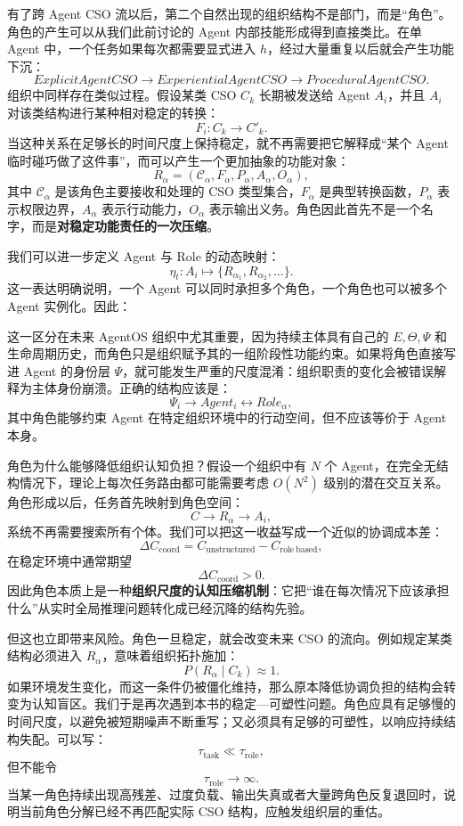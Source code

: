 有了跨 Agent CSO 流以后，第二个自然出现的组织结构不是部门，而是“角色”。角色的产生可以从我们此前讨论的 Agent 内部技能形成得到直接类比。在单 Agent 中，一个任务如果每次都需要显式进入 $h$，经过大量重复以后就会产生功能下沉：
\[
ExplicitAgentCSO
\rightarrow
ExperientialAgentCSO
\rightarrow
ProceduralAgentCSO.
\]
组织中同样存在类似过程。假设某类 CSO $C_k$ 长期被发送给 Agent $A_i$，并且 $A_i$ 对该类结构进行某种相对稳定的转换：
\[
F_i:C_k\rightarrow C'_k.
\]
当这种关系在足够长的时间尺度上保持稳定，就不再需要把它解释成“某个 Agent 临时碰巧做了这件事”，而可以产生一个更加抽象的功能对象：
\[
R_\alpha
=
\left(
\mathcal C_\alpha,
F_\alpha,
P_\alpha,
A_\alpha,
O_\alpha
\right),
\]
其中 $\mathcal C_\alpha$ 是该角色主要接收和处理的 CSO 类型集合，$F_\alpha$ 是典型转换函数，$P_\alpha$ 表示权限边界，$A_\alpha$ 表示行动能力，$O_\alpha$ 表示输出义务。角色因此首先不是一个名字，而是\textbf{对稳定功能责任的一次压缩}。

我们可以进一步定义 Agent 与 Role 的动态映射：
\[
\eta_t:A_i\mapsto\{R_{\alpha_1},R_{\alpha_2},\ldots\}.
\]
这一表达明确说明，一个 Agent 可以同时承担多个角色，一个角色也可以被多个 Agent 实例化。因此：
\begin{statementbox}
\centering
{}
\end{statementbox}
这一区分在未来 AgentOS 组织中尤其重要，因为持续主体具有自己的 $E,\Theta,\Psi$ 和生命周期历史，而角色只是组织赋予其的一组阶段性功能约束。如果将角色直接写进 Agent 的身份层 $\Psi$，就可能发生严重的尺度混淆：组织职责的变化会被错误解释为主体身份崩溃。正确的结构应该是：
\[
\Psi_i
\longrightarrow
Agent_i
\longleftrightarrow
Role_\alpha,
\]
其中角色能够约束 Agent 在特定组织环境中的行动空间，但不应该等价于 Agent 本身。

角色为什么能够降低组织认知负担？假设一个组织中有 $N$ 个 Agent，在完全无结构情况下，理论上每次任务路由都可能需要考虑 $O(N^2)$ 级别的潜在交互关系。角色形成以后，任务首先映射到角色空间：
\[
C
\rightarrow
R_\alpha
\rightarrow
A_i,
\]
系统不再需要搜索所有个体。我们可以把这一收益写成一个近似的协调成本差：
\[
\Delta C_{\mathrm{coord}}
=
C_{\mathrm{unstructured}}
-
C_{\mathrm{role\ based}},
\]
在稳定环境中通常期望
\[
\Delta C_{\mathrm{coord}}>0.
\]
因此角色本质上是一种\textbf{组织尺度的认知压缩机制}：它把“谁在每次情况下应该承担什么”从实时全局推理问题转化成已经沉降的结构先验。

但这也立即带来风险。角色一旦稳定，就会改变未来 CSO 的流向。例如规定某类结构必须进入 $R_\alpha$，意味着组织拓扑施加：
\[
P(R_\alpha\mid C_k)\approx 1.
\]
如果环境发生变化，而这一条件仍被僵化维持，那么原本降低协调负担的结构会转变为认知盲区。我们于是再次遇到本书的稳定—可塑性问题。角色应具有足够慢的时间尺度，以避免被短期噪声不断重写；又必须具有足够的可塑性，以响应持续结构失配。可以写：
\[
\tau_{\mathrm{task}}
\ll
\tau_{\mathrm{role}},
\]
但不能令
\[
\tau_{\mathrm{role}}\rightarrow\infty.
\]
当某一角色持续出现高残差、过度负载、输出失真或者大量跨角色反复退回时，说明当前角色分解已经不再匹配实际 CSO 结构，应触发组织层的重估。


